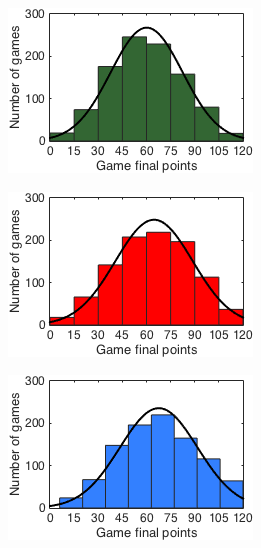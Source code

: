 \begin{figure}[h]
        \centering
        \begin{subfigure}[h]{0.32\textwidth}
                \includegraphics[width=\textwidth]{./img/4/histA}
                \caption{}
                \label{fig:histA}
        \end{subfigure}
        \begin{subfigure}[h]{0.32\textwidth}
                \includegraphics[width=\textwidth]{./img/4/histB}
                \caption{}
                \label{fig:histB}
        \end{subfigure}
        \begin{subfigure}[h]{0.32\textwidth}
                \includegraphics[width=\textwidth]{./img/4/histC}

\end{subfigure}
\end{figure}
